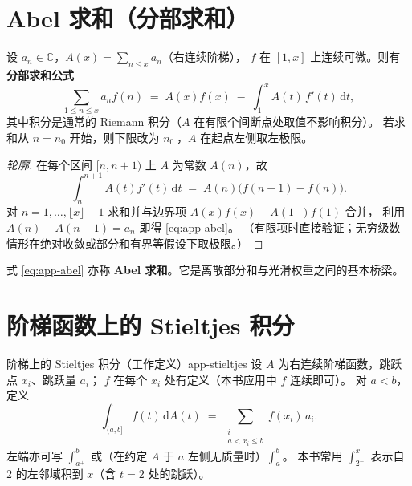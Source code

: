 \section{Abel 求和（分部求和）}
\label{sec:app-abel}

设 $a_n\in\mathbb{C}$，$A(x)=\sum_{n\le x}a_n$（右连续阶梯），
$f$ 在 $[1,x]$ 上连续可微。则有\textbf{分部求和公式}
\begin{equation}
  \sum_{1\le n\le x} a_n f(n)
  \;=\;
  A(x)f(x)
  \;-\;
  \int_1^{x} A(t)\,f'(t)\,\mathrm{d}t,
  \label{eq:app-abel}
\end{equation}
其中积分是通常的 Riemann 积分（$A$ 在有限个间断点处取值不影响积分）。
若求和从 $n=n_0$ 开始，则下限改为 $n_0^-$，$A$ 在起点左侧取左极限。

\begin{proof}[轮廓]
在每个区间 $[n,n+1)$ 上 $A$ 为常数 $A(n)$，故
\[
\int_n^{n+1} A(t)f'(t)\,\mathrm{d}t
  \;=\;
  A(n)\bigl(f(n+1)-f(n)\bigr).
\]
对 $n=1,\ldots,\lfloor x\rfloor-1$ 求和并与边界项 $A(x)f(x)-A(1^-)f(1)$ 合并，
利用 $A(n)-A(n-1)=a_n$ 即得 \eqref{eq:app-abel}。
（有限项时直接验证；无穷级数情形在绝对收敛或部分和有界等假设下取极限。）
\end{proof}

式 \eqref{eq:app-abel} 亦称 \textbf{Abel 求和}。它是离散部分和与光滑权重之间的基本桥梁。

\section{阶梯函数上的 Stieltjes 积分}
\label{sec:app-stieltjes}

\begin{definition}{阶梯上的 Stieltjes 积分（工作定义）}{app-stieltjes}
设 $A$ 为右连续阶梯函数，跳跃点 $x_i$、跳跃量 $a_i$；
$f$ 在每个 $x_i$ 处有定义（本书应用中 $f$ 连续即可）。
对 $a<b$，定义
\begin{equation}
  \int_{(a,b]} f(t)\,\mathrm{d}A(t)
  \;=\;
  \sum_{\substack{i \\ a < x_i \le b}} f(x_i)\,a_i.
  \label{eq:app-stieltjes-def}
\end{equation}
左端亦可写 $\int_{a^+}^{b}$ 或（在约定 $A$ 于 $a$ 左侧无质量时）$\int_a^b$。
本书常用 $\int_{2^-}^{x}$ 表示自 $2$ 的左邻域积到 $x$（含 $t=2$ 处的跳跃）。
\end{definition}

